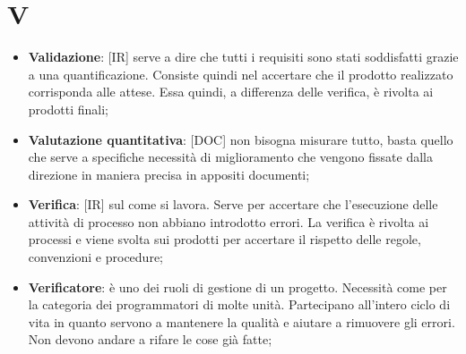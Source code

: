 %
%
%

\section{V}

\begin{itemize}
	\item \textbf{Validazione}: [IR] serve a dire che tutti i requisiti sono stati soddisfatti grazie a una quantificazione. Consiste quindi nel accertare che il prodotto realizzato corrisponda alle attese. Essa quindi, a differenza delle verifica, è rivolta ai prodotti finali;

	\item \textbf{Valutazione quantitativa}: [DOC] non bisogna misurare tutto, basta quello che serve a specifiche necessità di miglioramento che vengono fissate dalla direzione in maniera precisa in appositi documenti;

	\item \textbf{Verifica}: [IR] sul come si lavora. Serve per accertare che l'esecuzione delle attività di processo non abbiano introdotto errori. La verifica è rivolta ai processi e viene svolta sui prodotti per accertare il rispetto delle regole, convenzioni e procedure;

	\item \textbf{Verificatore}: è uno dei ruoli di gestione di un progetto. Necessità come per la categoria dei programmatori di molte unità. Partecipano all'intero ciclo di vita in quanto servono a mantenere la qualità e aiutare a rimuovere gli errori. Non devono andare a rifare le cose già fatte;

\end{itemize}